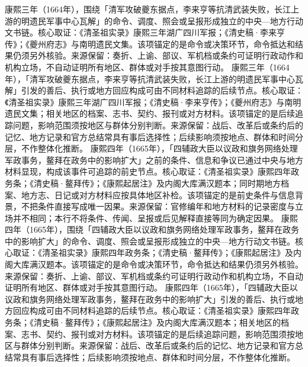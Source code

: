 康熙三年（1664年），围绕「清军攻破夔东据点，李来亨等抗清武装失败，长江上游的明遗民军事中心瓦解」的命令、调度、照会或呈报形成独立的中央—地方行动文书链。核心取证：《清圣祖实录》康熙三年湖广四川军报；《清史稿·李来亨传》；《夔州府志》与南明遗民文集。该项锚定的是命令或决策环节，命令抵达和结果仍须另外核验。来源保留：奏折、上谕、部议、军机档或条约可证明行政动作和机构立场，不自动证明所有地区、群体或对手按其意图行动。
康熙三年（1664年），「清军攻破夔东据点，李来亨等抗清武装失败，长江上游的明遗民军事中心瓦解」引发的善后、执行或地方回应构成可由不同材料追踪的后续节点。核心取证：《清圣祖实录》康熙三年湖广四川军报；《清史稿·李来亨传》；《夔州府志》与南明遗民文集；相关地区的档案、志书、契约、报刊或对方材料。该项锚定的是后续追踪问题，影响范围须按地区与群体分别判断。来源保留：战后、改革后或条约后的记忆、地方记录和官方总结常具有事后选择性；后续影响须按地点、群体和时间分层，不作整体化推断。
康熙四年（1665年），「四辅政大臣以议政和旗务网络处理军政事务，鳌拜在政务中的影响扩大」之前的条件、信息和争议已通过中央与地方材料显现，构成该事件可追踪的前史节点。核心取证：《清圣祖实录》康熙四年政务条；《清史稿·鳌拜传》；《康熙起居注》及内阁大库满汉题本；同时期地方档案、地方志、日记或对方材料应按具体地区补检。该项锚定的是前史条件与信息背景，不把条件直接写成唯一因果。来源保留：官修编年和地方材料的记录密度与立场并不相同；本行不将条件、传闻、呈报或后见解释直接等同为确定因果。
康熙四年（1665年），围绕「四辅政大臣以议政和旗务网络处理军政事务，鳌拜在政务中的影响扩大」的命令、调度、照会或呈报形成独立的中央—地方行动文书链。核心取证：《清圣祖实录》康熙四年政务条；《清史稿·鳌拜传》；《康熙起居注》及内阁大库满汉题本。该项锚定的是命令或决策环节，命令抵达和结果仍须另外核验。来源保留：奏折、上谕、部议、军机档或条约可证明行政动作和机构立场，不自动证明所有地区、群体或对手按其意图行动。
康熙四年（1665年），「四辅政大臣以议政和旗务网络处理军政事务，鳌拜在政务中的影响扩大」引发的善后、执行或地方回应构成可由不同材料追踪的后续节点。核心取证：《清圣祖实录》康熙四年政务条；《清史稿·鳌拜传》；《康熙起居注》及内阁大库满汉题本；相关地区的档案、志书、契约、报刊或对方材料。该项锚定的是后续追踪问题，影响范围须按地区与群体分别判断。来源保留：战后、改革后或条约后的记忆、地方记录和官方总结常具有事后选择性；后续影响须按地点、群体和时间分层，不作整体化推断。
